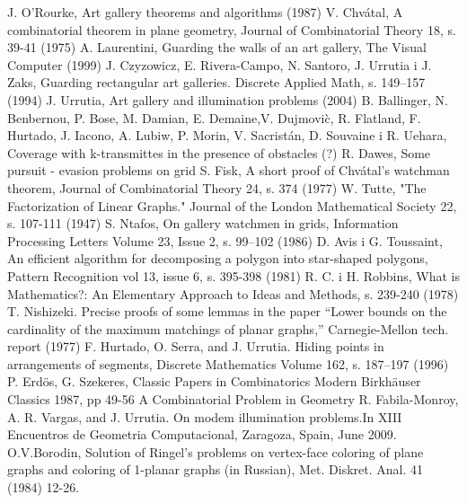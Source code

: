 \documentclass[brudnopis]{xmgr}
\theoremstyle{definition}
\begin{document}
\begin{bibdiv}
\begin{biblist}
  J. O'Rourke, Art gallery theorems and algorithms (1987)
  V. Chv\'atal, A combinatorial theorem in plane geometry, Journal of Combinatorial Theory 18, s. 39-41 (1975)
  A. Laurentini, Guarding the walls of an art gallery, The Visual Computer (1999)
  J. Czyzowicz, E. Rivera-Campo, N. Santoro, J. Urrutia i J. Zaks, Guarding rectangular art galleries. Discrete Applied Math, s. 149–157 (1994)
  J. Urrutia, Art gallery and illumination problems (2004)
  B. Ballinger, N. Benbernou, P. Bose, M. Damian, E. Demaine,V. Dujmovi\`c, R. Flatland, F. Hurtado, J. Iacono, A. Lubiw, P. Morin, V. Sacristán, D. Souvaine i R. Uehara, Coverage with k-transmittes in the presence of obstacles (?)
  R. Dawes, Some pursuit - evasion problems on grid
  S. Fisk, A short proof of Chv\'atal's watchman theorem, Journal of Combinatorial Theory 24, s. 374 (1977)
  W. Tutte, "The Factorization of Linear Graphs." Journal of the London Mathematical Society 22, s. 107-111 (1947)
  S. Ntafos, On gallery watchmen in grids, Information Processing Letters Volume 23, Issue 2, s. 99–102 (1986)
  D. Avis i G. Toussaint, An efficient algorithm for decomposing a polygon into star-shaped polygons, Pattern Recognition vol 13, issue 6, s. 395-398 (1981)
  R. C. i H. Robbins, What is Mathematics?: An Elementary Approach to Ideas and Methods, s. 239-240 (1978)
  T. Nishizeki. Precise proofs of some lemmas in the paper “Lower bounds on the cardinality of the maximum matchings of planar graphs,” Carnegie-Mellon tech. report (1977)
   F. Hurtado, O. Serra, and J. Urrutia. Hiding points in arrangements of segments, Discrete Mathematics Volume 162, s. 187–197  (1996)
   P. Erdös, G. Szekeres, Classic Papers in Combinatorics Modern Birkhäuser Classics 1987, pp 49-56 A Combinatorial Problem in Geometry
  R. Fabila-Monroy, A. R. Vargas, and J. Urrutia. On modem illumination problems.In XIII Encuentros de Geometria Computacional, Zaragoza, Spain, June 2009.
  O.V.Borodin, Solution of Ringel's problems on vertex-face coloring of plane graphs and coloring of 1-planar graphs (in Russian), Met. Diskret. Anal. 41 (1984) 12-26.

\end{biblist}
\end{bibdiv}
\end{document}
